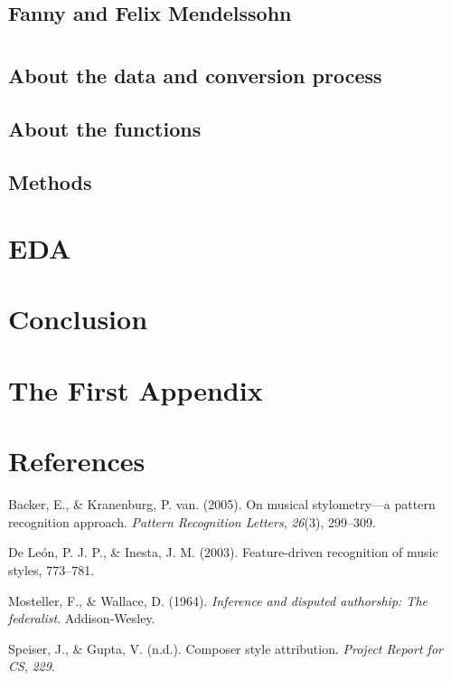 \documentclass[12pt,twoside]{reedthesis}
\theoremstyle{definition}
\theoremstyle{definition}
\theoremstyle{definition}
\theoremstyle{remark}
\begin{document}
\section{Fanny and Felix Mendelssohn}\label{fanny-and-felix-mendelssohn}

\chapter{}\label{section}

\section{About the data and conversion
process}\label{about-the-data-and-conversion-process}

\section{About the functions}\label{about-the-functions}

\section{Methods}\label{methods}

\chapter{EDA}\label{eda}

\chapter*{Conclusion}\label{conclusion}

\chapter{The First Appendix}\label{the-first-appendix}

\chapter*{References}\label{references}

\hypertarget{refs}{}
\hypertarget{ref-backer2005}{}
Backer, E., \& Kranenburg, P. van. (2005). On musical stylometry---a
pattern recognition approach. \emph{Pattern Recognition Letters},
\emph{26}(3), 299--309.

\hypertarget{ref-de2003feature}{}
De León, P. J. P., \& Inesta, J. M. (2003). Feature-driven recognition
of music styles, 773--781.

\hypertarget{ref-mosteller1964inference}{}
Mosteller, F., \& Wallace, D. (1964). \emph{Inference and disputed
authorship: The federalist}. Addison-Wesley.

\hypertarget{ref-CompStyleAttri}{}
Speiser, J., \& Gupta, V. (n.d.). Composer style attribution.
\emph{Project Report for CS}, \emph{229}.


\end{document}
